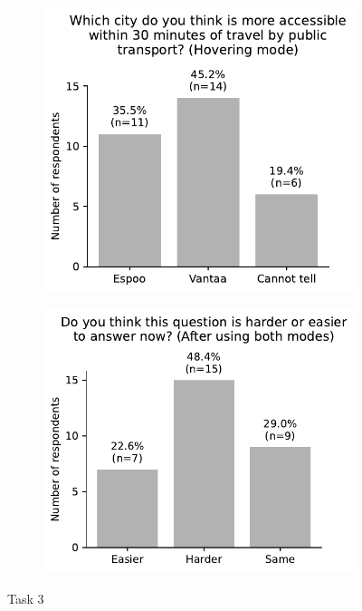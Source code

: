 \begin{appendices}
\begin{figure}[H]
	\centering
	\begin{subfigure}[b]{0.5\textwidth}
		\centering
		\includegraphics[width=\textwidth]{visual/figures/survey/3.pdf}
	\end{subfigure}%
	\hfill
	\begin{subfigure}[b]{0.5\textwidth}
		\centering
		\includegraphics[width=\textwidth]{visual/figures/survey/4.pdf}
	\end{subfigure}%
	\caption{Task 3}
	\label{fig:task 3}
\end{figure}


\end{appendices}
